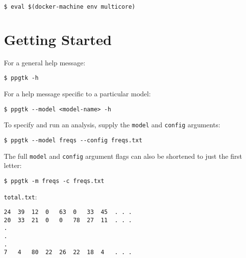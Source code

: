 \documentclass[11pt,english,letterpaper,oneside]{article}
\newcommand{\code}[1]{\hspace{5pt} \texttt{\$ #1}}
\begin{document}
\code{eval \$(docker-machine env multicore)}

\section{Getting Started}

For a general help message:

\code{ppgtk -h}

For a help message specific to a particular model:

\code{ppgtk -{}-model <model-name> -h}

To specify and run an analysis, supply the \texttt{model} and \texttt{config} arguments:

\code{ppgtk -{}-model freqs -{}-config freqs.txt}

The full \texttt{model} and \texttt{config} argument flags can also be shortened to just the first letter:

\code{ppgtk -m freqs -c freqs.txt}

\texttt{total.txt}:

\begin{verbatim}
24	39	12	0	63	0	33	45	. . .
20	33	21	0	0	78	27	11	. . .
.
.
.
7	4	80	22	26	22	18	4	. . .
\end{verbatim}

\newpage

%
%
\end{document}
